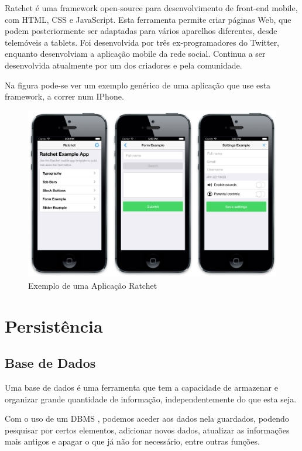 \documentclass{report}
\begin{document}
Ratchet é uma framework open-source para desenvolvimento de front-end mobile, com HTML, CSS e JavaScript. Esta ferramenta permite criar páginas Web, que podem posteriormente ser adaptadas para vários aparelhos diferentes, desde telemóveis a tablets. Foi desenvolvida por três ex-programadores do Twitter, enquanto desenvolviam a aplicação mobile da rede social. Continua a ser desenvolvida atualmente por um dos criadores e pela comunidade. 

Na figura pode-se ver um exemplo genérico de uma aplicação que use esta framework, a correr num IPhone.

\begin{figure}[!htb]
\label{fig.ratex}
\centering
\includegraphics[scale=0.19]{ratchet-example}
\caption[Exemplo de Ratchet]{Exemplo de uma Aplicação Ratchet}
\end{figure}

\section{Persistência}
\subsection{Base de Dados}
\label{ssec.db}
Uma base de dados é uma ferramenta que tem a capacidade de armazenar e organizar grande quantidade de informação, independentemente do que esta seja. 

Com o uso de um \ac{DBMS} , podemos aceder aos dados nela guardados, podendo pesquisar por certos elementos, adicionar novos dados, atualizar as informações mais antigos e apagar o que já não for necessário, entre outras funções.
\end{document}
